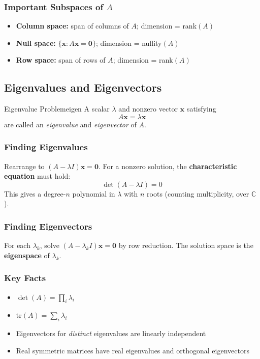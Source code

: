 \documentclass[11pt, letterpaper]{article}
\theoremstyle{plain}
\newcommand{\vv}[1]{\bm{#1}}
\begin{document}
\subsubsection*{Important Subspaces of $A$}
\begin{itemize}
    \item \textbf{Column space:} span of columns of $A$; dimension = rank$(A)$
    \item \textbf{Null space:} $\{\vv{x}: A\vv{x} = \vv{0}\}$; dimension = nullity$(A)$
    \item \textbf{Row space:} span of rows of $A$; dimension = rank$(A)$
\end{itemize}


\subsection{Eigenvalues and Eigenvectors}

\begin{definition}{Eigenvalue Problem}{eigen}
    A scalar $\lambda$ and nonzero vector $\vv{x}$ satisfying
    \[
        A\vv{x} = \lambda\vv{x}
    \]
    are called an \emph{eigenvalue} and \emph{eigenvector} of $A$.
\end{definition}

\subsubsection*{Finding Eigenvalues}
Rearrange to $(A - \lambda I)\vv{x} = \vv{0}$. For a nonzero solution,
the \textbf{characteristic equation} must hold:
\[
    \det(A - \lambda I) = 0
\]
This gives a degree-$n$ polynomial in $\lambda$ with $n$ roots (counting
multiplicity, over $\mathbb{C}$).

\subsubsection*{Finding Eigenvectors}
For each $\lambda_k$, solve $(A - \lambda_k I)\vv{x} = \vv{0}$ by row reduction.
The solution space is the \textbf{eigenspace} of $\lambda_k$.

\subsubsection*{Key Facts}
\begin{itemize}
    \item $\det(A) = \prod_i \lambda_i$
    \item $\text{tr}(A) = \sum_i \lambda_i$
    \item Eigenvectors for \emph{distinct} eigenvalues are linearly independent
    \item Real symmetric matrices have real eigenvalues and orthogonal eigenvectors
\end{itemize}
\end{document}
